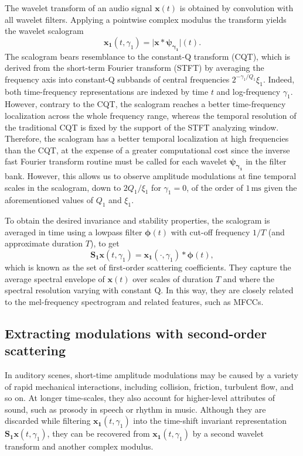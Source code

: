 \documentclass[smallextended]{svjour3}
\begin{document}
The wavelet transform of an audio signal
$\boldsymbol{x}(t)$ is obtained by convolution with all wavelet filters.
Applying a pointwise complex modulus the transform yields
the wavelet scalogram
\begin{equation}
\boldsymbol{x_1}(t, \gamma_1)
= \vert \boldsymbol{x} \ast \boldsymbol{\psi_{\gamma_1}} \vert (t)\mbox{.}
\end{equation}
The scalogram bears resemblance to the constant-Q transform (CQT),
which is derived from the short-term Fourier transform (STFT) by averaging the frequency
axis into constant-Q subbands of central frequencies $2^{-\gamma_1/Q_1}\xi_1$.
Indeed, both time-frequency representations are indexed by time $t$ and log-frequency $\gamma_1$.
However, contrary to the CQT, the scalogram reaches a better time-frequency localization across the whole
frequency range, whereas the temporal resolution of the traditional CQT is fixed by the support of the STFT analyzing window. %
Therefore, the scalogram has a better temporal localization at high
frequencies than the CQT, at the expense of a greater computational cost
since the inverse fast Fourier transform routine must be called for each wavelet $\boldsymbol{\psi_{\gamma_1}}$ in the filter bank.
However, this allows us to observe amplitude modulations at fine temporal scales in the scalogram, down to $2Q_1/\xi_1$ for $\gamma_1 = 0$, of the order of $1\,\textrm{ms}$ given the aforementioned values of $Q_1$ and $\xi_1$.

To obtain the desired invariance and stability properties, the scalogram is averaged in time using a lowpass filter $\boldsymbol{\phi}(t)$ with cut-off frequency $1/T$ (and approximate duration $T$), to get
\begin{equation}
\mathbf{S_1}\boldsymbol{x}(t, \gamma_1) = \boldsymbol{x_1}(\cdot, \gamma_1) \ast \boldsymbol{\phi}(t),
\end{equation}
which is known as the set of first-order scattering coefficients. They capture the average spectral envelope of $\boldsymbol{x}(t)$ over scales of duration $T$ and where the spectral resolution varying with constant Q. In this way, they are closely related to the mel-frequency spectrogram and related features, such as MFCCs.

\subsection{Extracting modulations with second-order scattering}
In auditory scenes, short-time amplitude modulations may be caused by a variety of rapid mechanical interactions, including collision, friction, turbulent flow, and so on.
At longer time-scales, they also account for higher-level attributes of sound, such as prosody in speech or rhythm in music.
Although they are discarded while filtering $\boldsymbol{x_1}(t,\gamma_1)$ into the time-shift invariant representation $\mathbf{S_1}\boldsymbol{x}(t,\gamma_1)$, they can be recovered from $\boldsymbol{x_1}(t,\gamma_1)$ by a second wavelet transform and another complex modulus.
\end{document}
